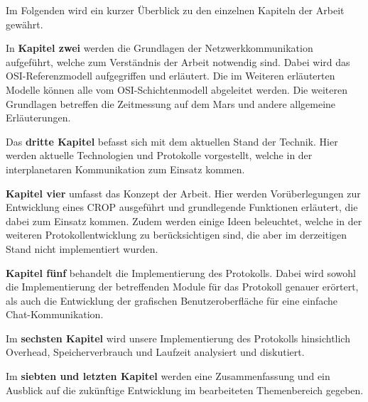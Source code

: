Im Folgenden wird ein kurzer {\"U}berblick zu den einzelnen
Kapiteln der Arbeit gew{\"a}hrt.

In \textbf{Kapitel zwei} werden die Grundlagen der Netzwerkkommunikation
aufgef{\"u}hrt, welche zum Verst{\"a}ndnis der Arbeit notwendig sind. Dabei wird
\zB das OSI-Referenzmodell aufgegriffen und erl{\"a}utert. Die im Weiteren
erl{\"a}uterten Modelle k{\"o}nnen alle vom OSI-Schichtenmodell abgeleitet
werden. Die weiteren Grundlagen betreffen die Zeitmessung auf dem Mars und
andere allgemeine Erl{\"a}uterungen.

Das \textbf{dritte Kapitel} befasst sich mit dem aktuellen Stand der Technik.
Hier werden aktuelle Technologien und Protokolle vorgestellt, welche in der
interplanetaren Kommunikation zum Einsatz kommen.

\textbf{Kapitel vier} umfasst das Konzept der Arbeit. Hier werden
Vor{\"u}berlegungen zur Entwicklung eines \gls{CROP} ausgef{\"u}hrt und
grundlegende Funktionen erl{\"a}utert, die dabei zum Einsatz kommen.
Zudem werden einige Ideen beleuchtet, welche in der weiteren
Protokollentwicklung zu ber{\"u}cksichtigen sind, die aber im derzeitigen Stand
nicht implementiert wurden.

\textbf{Kapitel f{\"u}nf} behandelt die Implementierung des Protokolls. Dabei
wird sowohl die Implementierung der betreffenden Module für das Protokoll
genauer er{\"o}rtert, als auch die Entwicklung der grafischen
Benutzeroberfläche f{\"u}r eine einfache Chat-Kommunikation.

Im \textbf{sechsten Kapitel} wird unsere Implementierung des Protokolls
hinsichtlich Overhead, Speicherverbrauch und Laufzeit analysiert und diskutiert.

Im \textbf{siebten und letzten Kapitel} werden eine Zusammenfassung und ein
Ausblick auf die zuk{\"u}nftige Entwicklung im bearbeiteten Themenbereich gegeben.

